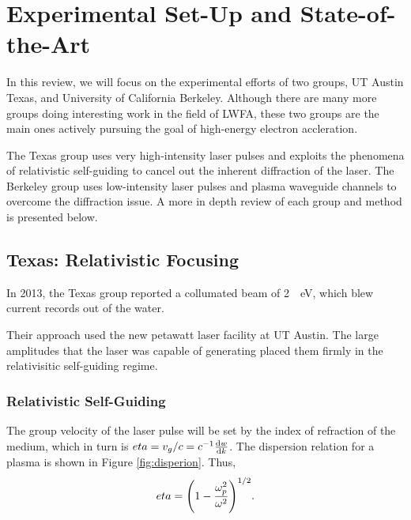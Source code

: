 \documentclass[12pt,letter]{article}
\begin{document}
\section{Experimental Set-Up and State-of-the-Art}
In this review, we will focus on the experimental efforts of two groups, UT
Austin Texas, and University of California Berkeley. Although there are many
more groups doing interesting work in the field of LWFA, these two groups are
the main ones actively pursuing the goal of high-energy electron
accleration.

The Texas group uses very high-intensity laser pulses and exploits the
phenomena of relativistic self-guiding to cancel out the inherent diffraction
of the laser. The Berkeley group uses low-intensity laser pulses and plasma waveguide channels to overcome the diffraction issue. A more in depth review of
each group and method is presented below.

\subsection{Texas: Relativistic Focusing}

In 2013, the Texas group reported a collumated beam of \SI{2}{\giga
\electronvolt}, which blew current records out of the
water\cite{Wang2013}.

Their approach used the new petawatt laser facility at UT Austin. The large
amplitudes that the laser was capable of generating placed them firmly in the
relativisitic self-guiding regime.

\subsubsection{Relativistic Self-Guiding}
The group velocity of the laser pulse will be set by the index of refraction of
the medium, which in turn is $eta = v_g/c = c^{-1}\dv{w}{k}$.  The dispersion
relation for a plasma is shown in Figure \ref{fig:disperion}. Thus,
\begin{equation}
    \label{eq:index}
    eta = \qty(1-\frac{\omega_p^2}{\omega^2})^{1/2}.
\end{equation}
\end{document}
